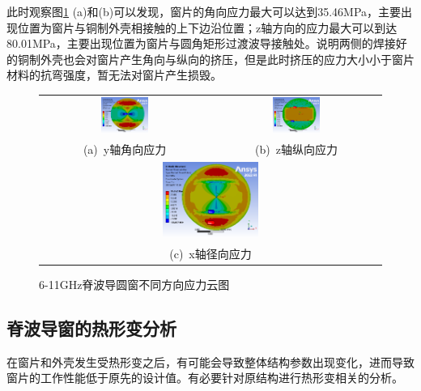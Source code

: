 \documentclass[master]{thesis-uestc}
\begin{document}
此时观察图\ref{fig:X输入不同方向应力分布} (a)和(b)可以发现，窗片的角向应力最大可以达到35.46MPa，主要出现位置为窗片与铜制外壳相接触的上下边沿位置；z轴方向的应力最大可以到达80.01MPa，主要出现位置为窗片与圆角矩形过渡波导接触处。说明两侧的焊接好的铜制外壳也会对窗片产生角向与纵向的挤压，但是此时挤压的应力大小小于窗片材料的抗弯强度，暂无法对窗片产生损毁。
\begin{figure}[!htb]
    \small
    \centering
    \begin{tabular}{@{\ }c@{\ }c}
        \includegraphics[width=0.29\textwidth]{pic/chapter3/Xy轴角向应力.png} & 
        \hspace{5pt}
        \includegraphics[width=0.29\textwidth]{pic/chapter3/Xz轴纵向应力.png}     \\
        \mbox{\small (a) y轴角向应力}                                                                               & 
        \mbox{\small (b) z轴纵向应力}                                                           \\[6bp]
        \multicolumn{2}{c}{\includegraphics[width=0.29\textwidth]{pic/chapter3/Xx轴径向应力.png}} \\  %
        \multicolumn{2}{c}{\mbox{\small (c) x轴径向应力}}             
    \end{tabular}
    \caption{6-11GHz脊波导圆窗不同方向应力云图}
    \label{fig:X输入不同方向应力分布}
\end{figure}

\subsection{脊波导窗的热形变分析}
在窗片和外壳发生受热形变之后，有可能会导致整体结构参数出现变化，进而导致窗片的工作性能低于原先的设计值。有必要针对原结构进行热形变相关的分析。
\end{document}
